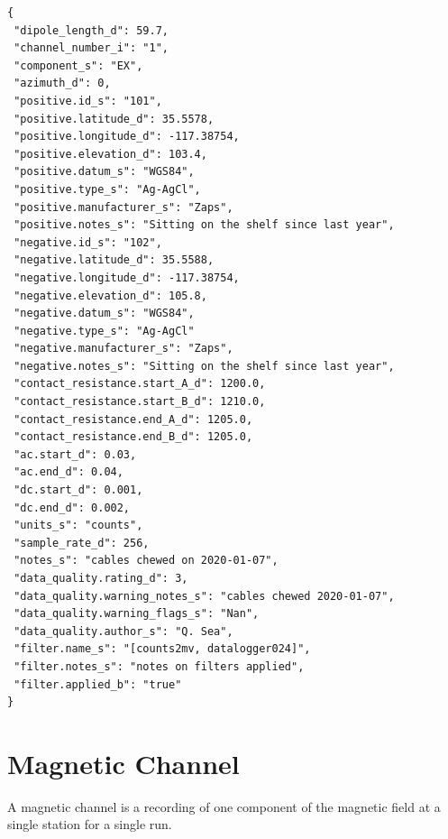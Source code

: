 \documentclass{article}
\begin{document}
\begin{verbatim}
{
 "dipole_length_d": 59.7,
 "channel_number_i": "1",
 "component_s": "EX",
 "azimuth_d": 0,
 "positive.id_s": "101",
 "positive.latitude_d": 35.5578,
 "positive.longitude_d": -117.38754,
 "positive.elevation_d": 103.4,
 "positive.datum_s": "WGS84",
 "positive.type_s": "Ag-AgCl",
 "positive.manufacturer_s": "Zaps",
 "positive.notes_s": "Sitting on the shelf since last year",
 "negative.id_s": "102",
 "negative.latitude_d": 35.5588,
 "negative.longitude_d": -117.38754,
 "negative.elevation_d": 105.8,
 "negative.datum_s": "WGS84",
 "negative.type_s": "Ag-AgCl"
 "negative.manufacturer_s": "Zaps",
 "negative.notes_s": "Sitting on the shelf since last year",
 "contact_resistance.start_A_d": 1200.0,
 "contact_resistance.start_B_d": 1210.0,
 "contact_resistance.end_A_d": 1205.0,
 "contact_resistance.end_B_d": 1205.0,
 "ac.start_d": 0.03,
 "ac.end_d": 0.04,
 "dc.start_d": 0.001,
 "dc.end_d": 0.002,
 "units_s": "counts",
 "sample_rate_d": 256,
 "notes_s": "cables chewed on 2020-01-07",
 "data_quality.rating_d": 3,
 "data_quality.warning_notes_s": "cables chewed 2020-01-07",
 "data_quality.warning_flags_s": "Nan",
 "data_quality.author_s": "Q. Sea",
 "filter.name_s": "[counts2mv, datalogger024]",
 "filter.notes_s": "notes on filters applied",
 "filter.applied_b": "true"
}
\end{verbatim}

\newpage
\section{Magnetic Channel}

A magnetic channel is a recording of one component of the magnetic field at a single station for a single run.
\end{document}
